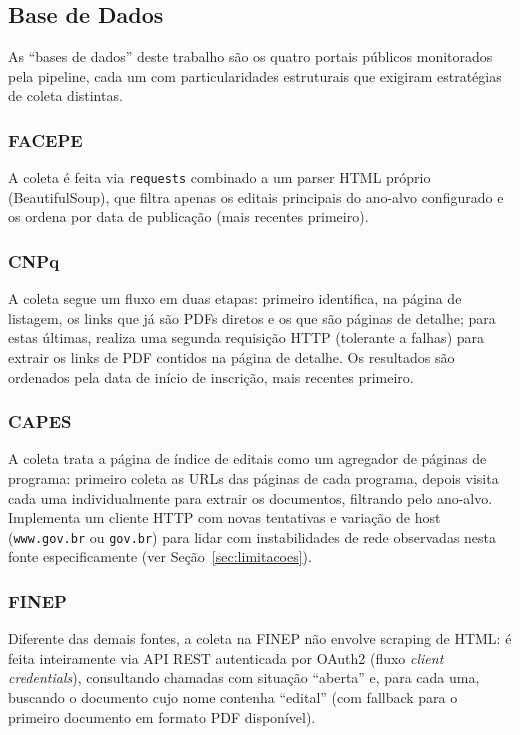 \documentclass[12pt]{article}
\begin{document}
  \subsection{Base de Dados}\label{sec:base-de-dados}
  As ``bases de dados'' deste trabalho são os quatro portais públicos monitorados pela pipeline, cada um com particularidades estruturais que exigiram estratégias de coleta distintas.

  \subsubsection{FACEPE}
  A coleta é feita via \texttt{requests} combinado a um parser HTML próprio (BeautifulSoup), que filtra apenas os editais principais do ano-alvo configurado e os ordena por data de publicação (mais recentes primeiro).

  \subsubsection{CNPq}
  A coleta segue um fluxo em duas etapas: primeiro identifica, na página de listagem, os links que já são PDFs diretos e os que são páginas de detalhe; para estas últimas, realiza uma segunda requisição HTTP (tolerante a falhas) para extrair os links de PDF contidos na página de detalhe. Os resultados são ordenados pela data de início de inscrição, mais recentes primeiro.

  \subsubsection{CAPES}
  A coleta trata a página de índice de editais como um agregador de páginas de programa: primeiro coleta as URLs das páginas de cada programa, depois visita cada uma individualmente para extrair os documentos, filtrando pelo ano-alvo. Implementa um cliente HTTP com novas tentativas e variação de host (\texttt{www.gov.br} ou \texttt{gov.br}) para lidar com instabilidades de rede observadas nesta fonte especificamente (ver Seção~\ref{sec:limitacoes}).

  \subsubsection{FINEP}
  Diferente das demais fontes, a coleta na FINEP não envolve scraping de HTML: é feita inteiramente via API REST autenticada por OAuth2 (fluxo \emph{client credentials}), consultando chamadas com situação ``aberta'' e, para cada uma, buscando o documento cujo nome contenha ``edital'' (com fallback para o primeiro documento em formato PDF disponível).
\end{document}
